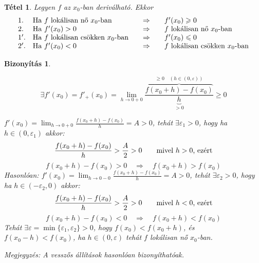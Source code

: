 \documentclass[a4paper,12pt,twoside]{book}
\newtheorem{tetel}{Tétel}[chapter]
\theoremstyle{break}
\newtheorem{biz}{Bizonyítás}[chapter]
\theoremstyle{plain}
\begin{document}
\begin{tetel} \label{LokalisanNoCsokken}
 Legyen $f$ az $x_0$-ban deriválható. Ekkor
\[\begin{array}{llcl}
 1. & \hbox{Ha $f$ lokálisan nő $x_0$-ban} & \quad\Rightarrow\quad & f'(x_0) \geqslant 0\\
 2. & \hbox{Ha $f'(x_0)>0$} & \quad\Rightarrow\quad & \hbox{$f$ lokálisan nő $x_0$-ban}\\
 1'. & \hbox{Ha $f$ lokálisan csökken $x_0$-ban} & \quad\Rightarrow\quad & f'(x_0) \leqslant 0\\
 2'. & \hbox{Ha $f'(x_0)<0$} & \quad\Rightarrow\quad & \hbox{$f$ lokálisan csökken $x_0$-ban}\\
         \end{array}\]
\end{tetel}
\begin{biz}
 \begin{enumerate*}
  \item
    \[\exists f'(x_0) = f'_+(x_0) = \lim_{h\to 0+0} \frac{\overbrace{f(x_0+h)-f(x_0)}^{\geqslant 0 \quad (h\in(0,\varepsilon))}}{\underbrace{h}_{>0}} \geqslant 0\]
  \item $f'(x_0)=\displaystyle \lim_{h\to 0+0} \frac{f(x_0+h)-f(x_0)}{h} = A > 0$, tehát $\exists \varepsilon_1>0$, hogy ha $h\in(0,\varepsilon_1)$ akkor:
 \[\frac{f(x_0+h)-f(x_0)}{h}>\frac{A}{2}>0 \qquad \hbox{mivel $h>0$, ezért}\]
 \[f(x_0+h)-f(x_0) > 0 \quad \Rightarrow \quad \boxed{f(x_0+h)>f(x_0)}\]
   Hasonlóan: $f'(x_0)=\displaystyle \lim_{h\to 0-0} \frac{f(x_0+h)-f(x_0)}{h} = A > 0$, tehát $\exists \varepsilon_2>0$, hogy ha $h\in(-\varepsilon_2,0)$ akkor:
 \[\frac{f(x_0+h)-f(x_0)}{h}>\frac{A}{2}>0 \qquad \hbox{mivel $h<0$, ezért}\]
 \[f(x_0+h)-f(x_0) < 0 \quad \Rightarrow \quad \boxed{f(x_0+h)<f(x_0)}\]
 Tehát $\exists\varepsilon = \min\{\varepsilon_1, \varepsilon_2\} > 0$, hogy $f(x_0)<f(x_0+h)$, és $f(x_0-h)<f(x_0)$, ha $h\in(0,\varepsilon)$ tehát $f$ lokálisan nő $x_0$-ban.
 \end{enumerate*}
 \emph{Megjegyzés}: A vesszős állítások hasonlóan bizonyíthatóak.
\end{biz}
\end{document}
